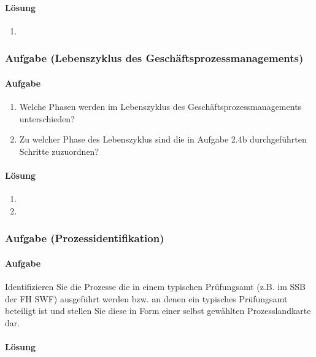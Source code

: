 \paragraph*{Lösung}
    \begin{enumerate}[label=\alph*)]
        \item 
    \end{enumerate}


\subsubsection*{Aufgabe (Lebenszyklus des Geschäftsprozessmanagements)}
\paragraph*{Aufgabe}
    \begin{enumerate}[label=\alph*)]
        \item Welche Phasen werden im Lebenszyklus des Geschäftsprozessmanagements unterschieden?
        \item Zu welcher Phase des Lebenszyklus sind die in Aufgabe 2.4b durchgeführten Schritte zuzuordnen?
    \end{enumerate}
   
\paragraph*{Lösung}
    \begin{enumerate}[label=\alph*)]
        \item 
        \item 
    \end{enumerate}


\subsubsection*{Aufgabe (Prozessidentifikation)}
\paragraph*{Aufgabe}
    Identifizieren Sie die Prozesse die in einem typischen Prüfungsamt (z.B. im SSB der FH SWF) ausgeführt werden bzw. an denen ein typisches Prüfungsamt beteiligt ist und stellen Sie diese in Form einer selbst gewählten Prozesslandkarte dar.
   
\paragraph*{Lösung}


